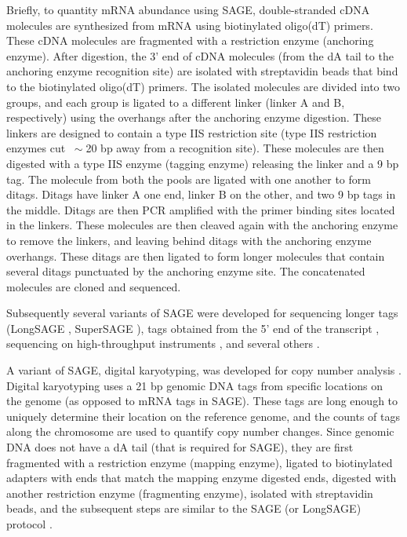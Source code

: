 Briefly, to quantity mRNA abundance using SAGE, double-stranded cDNA
molecules are synthesized from mRNA using biotinylated oligo(dT) primers.
These cDNA molecules are fragmented with a restriction enzyme (anchoring
enzyme).
%
After digestion, the 3' end of cDNA molecules (from the dA tail to the
anchoring enzyme recognition site) are isolated with streptavidin beads
that bind to the biotinylated oligo(dT) primers.
%
The isolated molecules are divided into two groups, and each group is
ligated to a different linker (linker A and B, respectively) using the
overhangs after the anchoring enzyme digestion. These linkers are
designed to contain a type IIS restriction site (type IIS restriction
enzymes cut $~\sim$20 bp away from a recognition site).
%
These molecules are then digested with a type IIS enzyme (tagging
enzyme) releasing the linker and a 9 bp tag.
%
The molecule from both the pools are ligated with one another to form
ditags. Ditags have linker A one end, linker B on the other, and two 9
bp tags in the middle.
%
Ditags are then PCR amplified with the primer binding sites located in
the linkers.
%
These molecules are then cleaved again with the anchoring enzyme to
remove the linkers, and leaving behind ditags with the anchoring enzyme
overhangs.  These ditags are then ligated to form longer molecules
that contain several ditags punctuated by the anchoring enzyme site.
%
The concatenated molecules are cloned and sequenced.


Subsequently several variants of SAGE were developed for sequencing longer
tags (LongSAGE \citep{saha2002using,hu2006serial}, SuperSAGE
\citep{matsumura2003gene}), tags obtained from the 5'
end of the transcript \citep{wei20045}, sequencing on high-throughput
instruments \citep{matsumura2010high},  and several others
\citep{zawada2014massive,peters1999comprehensive}.


A variant of SAGE, digital karyotyping, was developed for copy number
analysis \citep{wang2002digital,leary2007digital}. Digital karyotyping
uses a 21 bp genomic DNA tags from specific locations on the genome (as
opposed to mRNA tags in SAGE).  These tags are long enough to uniquely
determine their location on the reference genome, and the counts of
tags along the chromosome are used to quantify copy number changes.
%
Since genomic DNA does not have a dA tail (that is required for SAGE),
they are first fragmented with a restriction enzyme (mapping enzyme),
ligated to biotinylated adapters with ends that match the mapping
enzyme digested ends, digested with another restriction enzyme
(fragmenting enzyme), isolated with streptavidin beads, and the
subsequent steps are similar to the SAGE (or LongSAGE) protocol
\citep{wang2002digital,leary2007digital}.

